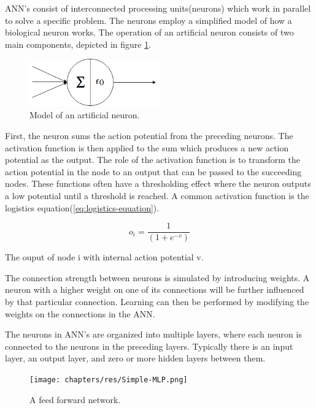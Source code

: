 ANN's consist of interconnected processing units(neurons) which work in parallel to solve a specific problem.
The neurons employ a simplified model of how a biological neuron works.
The operation of an artificial neuron consists of two main components, depicted in figure \ref{fig:artificial-neuron}.

\begin{figure}[H]
	
	\centering
	\includegraphics[width=0.5\textwidth]{chapters/res/Neuron.png}
	\caption{Model of an artificial neuron.}
	\label{fig:artificial-neuron}
\end{figure}
First, the neuron sums the action potential from the preceding neurons.
The activation function is then applied to the sum which produces a new action potential as the output.
The role of the activation function is to transform the action potential in the node to an output that can be passed to the succeeding nodes.
These functions often have a thresholding effect where the neuron outputs a low potential until a threshold is reached.
A common activation function is the logistics equation(\ref{eq:logistics-equation}).

\begin{captioneq}[H]
	\begin{equation}
	o_i= \frac{1}{(1+e^{-v})}
	\label{eq:logistics-equation}
	\end{equation}
	
	\caption{The ouput of node i with internal action potential v.}
\end{captioneq}

The connection strength between neurons is simulated by introducing weights.
A neuron with a higher weight on one of its connections will be further influenced by that particular connection.
Learning can then be performed by modifying the weights on the connections in the ANN.

The neurons in ANN's are organized into multiple layers, where each neuron is connected to the neurons in the preceding layers.
Typically there is an input layer, an output layer, and zero or more hidden layers between them.

\begin{figure}[H]
	\centering
	\texttt{[image: chapters/res/Simple-MLP.png]}
	\caption{A feed forward network.}
	\label{fig:mlp-simple}
\end{figure}

